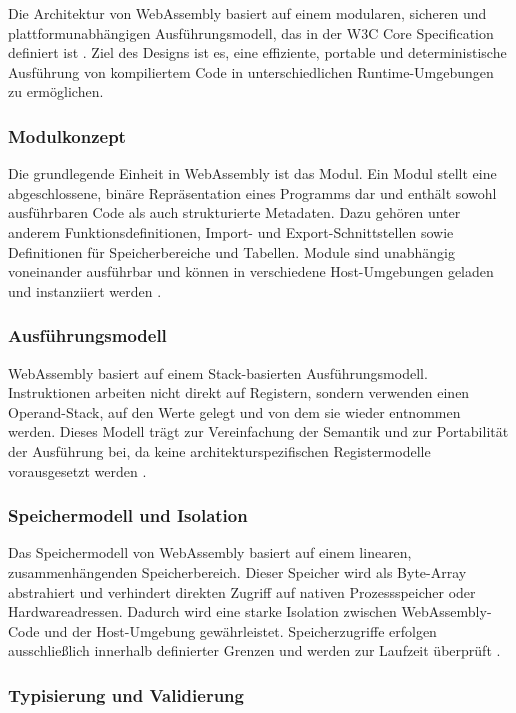 Die Architektur von WebAssembly basiert auf einem modularen, sicheren und plattformunabhängigen Ausführungsmodell, das in der W3C Core Specification definiert ist \cite{wasmcoreW3C}. Ziel des Designs ist es, eine effiziente, portable und deterministische Ausführung von kompiliertem Code in unterschiedlichen Runtime-Umgebungen zu ermöglichen.

\subsubsection{Modulkonzept}

Die grundlegende Einheit in WebAssembly ist das Modul. Ein Modul stellt eine abgeschlossene, binäre Repräsentation eines Programms dar und enthält sowohl ausführbaren Code als auch strukturierte Metadaten. Dazu gehören unter anderem Funktionsdefinitionen, Import- und Export-Schnittstellen sowie Definitionen für Speicherbereiche und Tabellen. Module sind unabhängig voneinander ausführbar und können in verschiedene Host-Umgebungen geladen und instanziiert werden \cite{wasmcoreW3C}.

\subsubsection{Ausführungsmodell}

WebAssembly basiert auf einem Stack-basierten Ausführungsmodell. Instruktionen arbeiten nicht direkt auf Registern, sondern verwenden einen Operand-Stack, auf den Werte gelegt und von dem sie wieder entnommen werden. Dieses Modell trägt zur Vereinfachung der Semantik und zur Portabilität der Ausführung bei, da keine architekturspezifischen Registermodelle vorausgesetzt werden \cite{wasmcoreW3C}.

\subsubsection{Speichermodell und Isolation}

Das Speichermodell von WebAssembly basiert auf einem linearen, zusammenhängenden Speicherbereich. Dieser Speicher wird als Byte-Array abstrahiert und verhindert direkten Zugriff auf nativen Prozessspeicher oder Hardwareadressen. Dadurch wird eine starke Isolation zwischen WebAssembly-Code und der Host-Umgebung gewährleistet. Speicherzugriffe erfolgen ausschließlich innerhalb definierter Grenzen und werden zur Laufzeit überprüft \cite{wasmcoreW3C}.

\subsubsection{Typisierung und Validierung}

